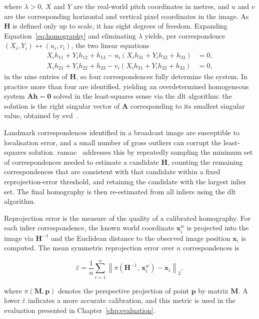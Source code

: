 \noindent where $\lambda > 0$, $X$ and $Y$ are the real-world pitch coordinates in metres, and $u$ and $v$ are the corresponding horizontal and vertical pixel coordinates in the image. As $\mathbf{H}$ is defined only up to scale, it has eight degrees of freedom. Expanding Equation~\ref{eq:homography} and eliminating $\lambda$ yields, per correspondence $(X_i, Y_i) \leftrightarrow (u_i, v_i)$, the two linear equations
\begin{align*}
  X_i h_{11} + Y_i h_{12} + h_{13} - u_i(X_i h_{31} + Y_i h_{32} + h_{33}) &= 0, \\
  X_i h_{21} + Y_i h_{22} + h_{23} - v_i(X_i h_{31} + Y_i h_{32} + h_{33}) &= 0,
\end{align*}
in the nine entries of $\mathbf{H}$, so four correspondences fully determine the system. In practice more than four are identified, yielding an overdetermined homogeneous system $\mathbf{A}\mathbf{h} = \mathbf{0}$ solved in the least-squares sense via the \gls{dlt} algorithm: the solution is the right singular vector of $\mathbf{A}$ corresponding to its smallest singular value, obtained by \gls{svd}~\cite{hartley2004multiple}.

Landmark correspondences identified in a broadcast image are susceptible to localisation error, and a small number of gross outliers can corrupt the least-squares solution. \Gls{ransac}~\cite{fischler1981ransac} addresses this by repeatedly sampling the minimum set of correspondences needed to estimate a candidate $\mathbf{H}$, counting the remaining correspondences that are consistent with that candidate within a fixed reprojection-error threshold, and retaining the candidate with the largest inlier set. The final homography is then re-estimated from all inliers using the \gls{dlt} algorithm.

Reprojection error is the measure of the quality of a calibrated homography. For each inlier correspondence, the known world coordinate $\mathbf{x}_i^w$ is projected into the image via $\mathbf{H}^{-1}$ and the Euclidean distance to the observed image position $\mathbf{x}_i$ is computed. The mean symmetric reprojection error over $n$ correspondences is

\begin{equation}
  \bar{\varepsilon} = \frac{1}{n} \sum_{i=1}^{n} \left\| \pi\!\left(\mathbf{H}^{-1},\, \mathbf{x}_i^w\right) - \mathbf{x}_i \right\|_2,
  \label{eq:reproj}
\end{equation}

\noindent where $\pi(\mathbf{M}, \mathbf{p})$ denotes the perspective projection of point $\mathbf{p}$ by matrix $\mathbf{M}$. A lower $\bar{\varepsilon}$ indicates a more accurate calibration, and this metric is used in the evaluation presented in Chapter~\ref{chp:evaluation}.

